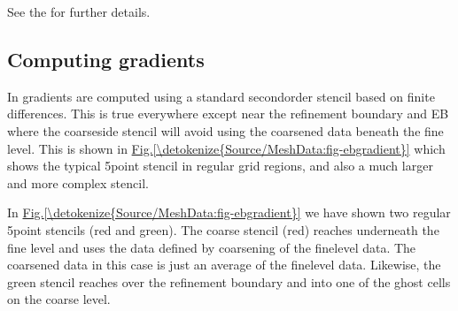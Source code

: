 \documentclass[letterpaper,10pt,english]{sphinxmanual}
\begin{document}
\begin{sphinxVerbatim}[commandchars=\\\{\},formatcom=\scriptsize]
      

         
\end{sphinxVerbatim}

\sphinxAtStartPar
See the  for further details.


\subsection{Computing gradients}
\label{\detokenize{Source/MeshData:computing-gradients}}\label{\detokenize{Source/MeshData:chap-gradients}}
\sphinxAtStartPar
In  gradients are computed using a standard second\sphinxhyphen{}order stencil based on finite differences.
This is true everywhere except near the refinement boundary and EB where the coarse\sphinxhyphen{}side stencil will avoid using the coarsened data beneath the fine level.
This is shown in \hyperref[\detokenize{Source/MeshData:fig-ebgradient}]{Fig.\@ \ref{\detokenize{Source/MeshData:fig-ebgradient}}} which shows the typical 5\sphinxhyphen{}point stencil in regular grid regions, and also a much larger and more complex stencil.

\sphinxAtStartPar
In \hyperref[\detokenize{Source/MeshData:fig-ebgradient}]{Fig.\@ \ref{\detokenize{Source/MeshData:fig-ebgradient}}} we have shown two regular 5\sphinxhyphen{}point stencils (red and green).
The coarse stencil (red) reaches underneath the fine level and uses the data defined by coarsening of the fine\sphinxhyphen{}level data.
The coarsened data in this case is just an average of the fine\sphinxhyphen{}level data.
Likewise, the green stencil reaches over the refinement boundary and into one of the ghost cells on the coarse level.
\end{document}
